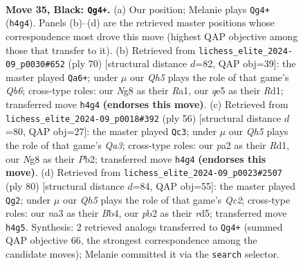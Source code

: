 \documentclass[11pt]{article}
\begin{document}
\clearpage

\begin{figure}[p]\centering
\begin{subfigure}{0.46\textwidth}\centering
\resizebox{\linewidth}{!}{%
\newchessgame
\chessboard[
  setfen={6nr/1kr3p1/8/2p1Q1Pp/2P2P1q/N3B3/PP4K1/1R6 b - - 8 35},
  showmover=false,
  pgfstyle=straightmove, color=movearrow, markmove={h4-g4}
]}
\caption{}
\end{subfigure}\hfill
\begin{subfigure}{0.46\textwidth}\centering
\resizebox{\linewidth}{!}{%
\newchessgame
\chessboard[
  setfen={2kr1b2/5p2/1Q3P2/2Nq4/1p1p4/1Pp2nP1/5P2/R2R3K w - - 5 36},
  showmover=false,
  pgfstyle=straightmove, color=movearrow, markmove={b6-a6}
]}
\caption{}
\end{subfigure}
\\[4pt]
\begin{subfigure}{0.46\textwidth}\centering
\resizebox{\linewidth}{!}{%
\newchessgame
\chessboard[
  setfen={6k1/pr6/2p1pp2/3q1bp1/3P4/Q4P2/PP5R/3R2K1 w - - 2 29},
  showmover=false,
  pgfstyle=straightmove, color=movearrow, markmove={a3-c3}
]}
\caption{}
\end{subfigure}\hfill
\begin{subfigure}{0.46\textwidth}\centering
\resizebox{\linewidth}{!}{%
\newchessgame
\chessboard[
  setfen={4r3/5p1k/2R3p1/3rp2p/1B3b2/P4P1q/2Q4P/5R1K w - - 5 41},
  showmover=false,
  pgfstyle=straightmove, color=movearrow, markmove={c2-g2}
]}
\caption{}
\end{subfigure}
\caption{\textbf{Move 35, Black: \texttt{Qg4+}.} (a) Our position; Melanie plays \texttt{Qg4+} (\texttt{h4g4}). Panels (b)--(d) are the retrieved master positions whose correspondence most drove this move (highest QAP objective among those that transfer to it). (b) Retrieved from \texttt{lichess\_elite\_2024-09\_p0030\#652} (ply 70) [structural distance $d$=82, QAP obj=39]: the master played \texttt{Qa6+}; under $\mu$ our \emph{Qh5} plays the role of that game's \emph{Qb6}; cross-type roles: our \emph{N}g8 as their \emph{R}a1, our \emph{q}e5 as their \emph{R}d1; transferred move \texttt{h4g4} \textbf{(endorses this move)}. (c) Retrieved from \texttt{lichess\_elite\_2024-09\_p0018\#392} (ply 56) [structural distance $d$=80, QAP obj=27]: the master played \texttt{Qc3}; under $\mu$ our \emph{Qh5} plays the role of that game's \emph{Qa3}; cross-type roles: our \emph{p}a2 as their \emph{R}d1, our \emph{N}g8 as their \emph{P}b2; transferred move \texttt{h4g4} \textbf{(endorses this move)}. (d) Retrieved from \texttt{lichess\_elite\_2024-09\_p0023\#2507} (ply 80) [structural distance $d$=84, QAP obj=55]: the master played \texttt{Qg2}; under $\mu$ our \emph{Qh5} plays the role of that game's \emph{Qc2}; cross-type roles: our \emph{n}a3 as their \emph{B}b4, our \emph{p}b2 as their \emph{r}d5; transferred move \texttt{h4g5}. Synthesis: 2 retrieved analogs transferred to \texttt{Qg4+} (summed QAP objective 66, the strongest correspondence among the candidate moves); Melanie committed it via the \texttt{search} selector.}
\label{fig:thought-m69}
\end{figure}
\end{document}
